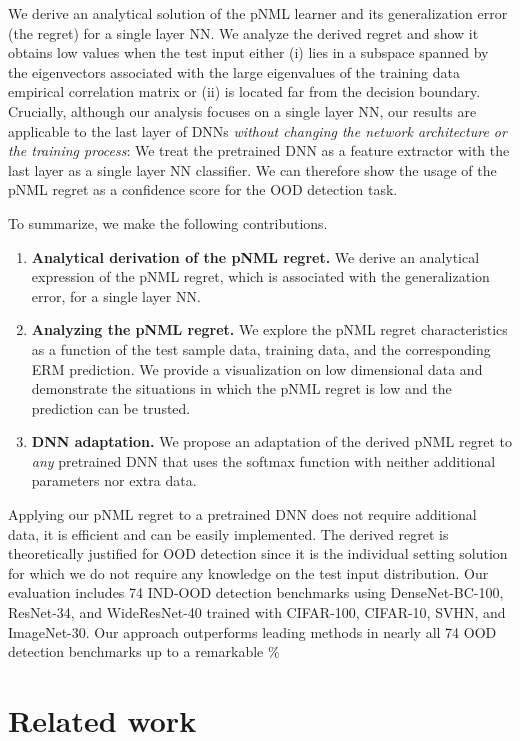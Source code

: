 \documentclass{article}
\begin{document}
We derive an analytical solution of the pNML learner and its generalization error (the regret) for a single layer NN.
We analyze the derived regret and show it obtains low values when the test input either (i) lies in a subspace spanned by the eigenvectors associated with the large eigenvalues of the training data empirical correlation matrix or (ii) is located far from the decision boundary.
Crucially, although our analysis focuses on a single layer NN, our results are applicable to the last layer of DNNs {\em without changing the network architecture or the training process}:
We treat the pretrained DNN as a feature extractor with the last layer as a single layer NN classifier.
We can therefore show the usage of the pNML regret as a confidence score for the OOD detection task.


To summarize, we make the following contributions.
\begin{enumerate}
    \item \textbf{Analytical derivation of the pNML regret.} We derive an analytical expression of the pNML regret, which is associated with the generalization error, for a single layer NN. 
    \item \textbf{Analyzing the pNML regret.}
     We explore the pNML regret characteristics as a function of the test sample data, training data, and the corresponding ERM prediction. We provide a visualization on low dimensional data and demonstrate the situations in which the pNML regret is low and the prediction can be trusted.
    \item \textbf{DNN adaptation.} We propose an adaptation of the derived pNML regret to {\em any} pretrained DNN that uses the softmax function with neither additional parameters nor extra data.
\end{enumerate}

Applying our pNML regret to a pretrained DNN does not require additional data, it is efficient and can be easily implemented.
The derived regret is theoretically justified for OOD detection since it is the individual setting solution for which we do not require any knowledge on the test input distribution.
Our evaluation includes 74 IND-OOD detection benchmarks using DenseNet-BC-100, ResNet-34, and WideResNet-40 trained with CIFAR-100, CIFAR-10, SVHN, and ImageNet-30.
Our approach outperforms leading methods in nearly all 74 OOD detection benchmarks up to a remarkable \% 




\section{Related work} 
\label{sec:related_work}
\end{document}
